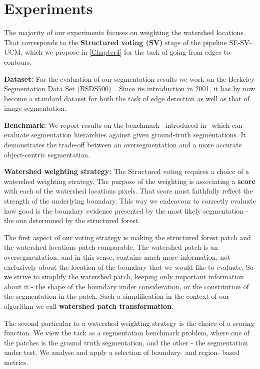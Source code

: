 \chapter{Experiments}
\label{Chapter5}
The majority of our experiments focuses on weighting the watershed locations. That corresponds to the \textbf{Structured voting (SV)} stage of the pipeline SE-SV-UCM, which we propose in \cref{Chapter4} for the task of going from edges to contours.

\textbf{Dataset:} For the evaluation of our segmentation results we work on the Berkeley Segmentation Data Set (BSDS500)~\cite{Arbelaez11}. Since its introduction in 2001, it has by now become a standard dataset for both the task of edge detection as well as that of image segmentation.

\textbf{Benchmark:} We report results on the benchmark~\cite{Galasso13Benchmark} introduced in~\cite{Galasso13} which can evaluate segmentation hierarchies against given ground-truth segmentations. It demonstrates the trade-off between an oversegmentation and a more accurate object-centric segmentation.

\textbf{Watershed weighting strategy:} The Structured voting requires a choice of a watershed weighting strategy. The purpose of the weighting is associating a \textbf{score} with each of the watershed locations pixels. That score must faithfully reflect the strength of the underlying boundary. This way we endeavour %
to correctly evaluate how good is the boundary evidence presented by the most likely segmentation - the one determined by the structured forest. 

The first aspect of our voting strategy is making the structured forest patch and the watershed locations patch comparable. The watershed patch is an oversegmentation, and in this sense, contains much more information, not exclusively about the location of the boundary that we would like to evaluate. So we strive to simplify the watershed patch, keeping only important information about it - the shape of the boundary under consideration, or the constitution of the segmentation in the patch. Such a simplification in the context of our algorithm we call {\bf watershed patch transformation}. %

The second particular to a watershed weighting strategy is the choice of a scoring function. We view the task as a segmentation benchmark problem, where one of the patches is the ground truth segmentation, and the other - the segmentation under test. We analyse and apply a selection of boundary- and region- based metrics.

